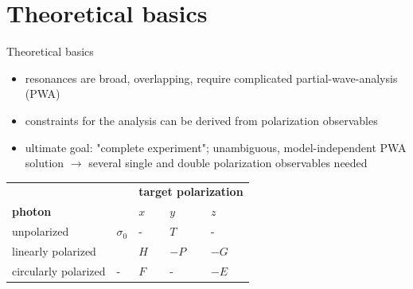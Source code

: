 \documentclass[11pt,aspectratio=169,dvipsnames]{beamer}
\newcommand{\thecolor}{black!70!blue}
\begin{document}
\section{Theoretical basics}

\begin{frame}{Theoretical basics}
	\begin{itemize}
		\item resonances are broad, overlapping, require complicated partial-wave-analysis (PWA)
		\item constraints for the analysis can be derived from polarization observables
		\item ultimate goal: "complete experiment"; unambiguous, model-independent PWA solution $\to$ several single and double polarization observables needed
	\end{itemize}
\begin{tcolorbox}[colback=blue!5,colframe=\thecolor,title = Beam-target polarization observables]
\centering
\begin{tabularx}{.7\linewidth}{|l|l|X|X|X|}
	\hline
	\multicolumn{2}{|c}{}&\multicolumn{3}{c|}{\textbf{target polarization}}\\
	\textbf{photon} & &$x$&$y$&$z$\\
	\hline
	unpolarized & $\sigma_0$&-&$T$&-\\
	linearly polarized &\color{red}{$-\Sigma$}&$H$&$-P$&$-G$\\
	circularly polarized &-&$F$&-&$-E$\\
	\hline
\end{tabularx}
\begin{flushright}
	\cites{san}
\end{flushright}
\end{tcolorbox}	
\end{frame}
\end{document}
